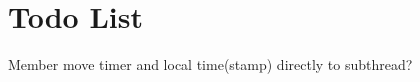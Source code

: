 \chapter{Todo List}
\hypertarget{todo}{}\label{todo}

\begin{DoxyRefList}
\item[Member \doxylink{class_tracer_update_sender_plugin_a45d46426f52789c65327fed82aee8eb1}{Tracer\+Update\+Sender\+Plugin\+::msg\+Sender} ]\label{todo__todo000001}%
%
move timer and local time(stamp) directly to subthread? 
\end{DoxyRefList}